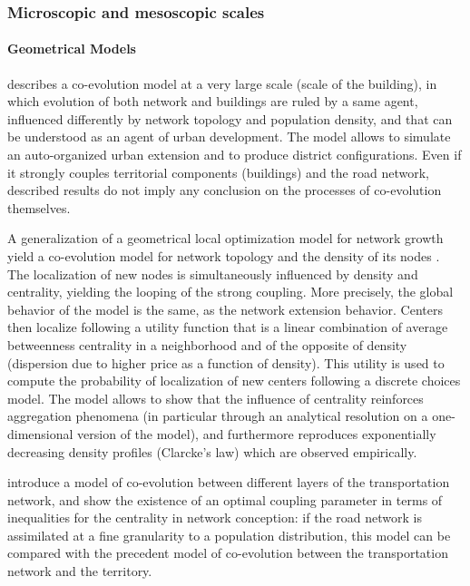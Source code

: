 \documentclass[11pt]{article}
\begin{document}
\subsubsection{Microscopic and mesoscopic scales}


\paragraph{Geometrical Models}

\cite{achibet2014model} describes a co-evolution model at a very large scale (scale of the building), in which evolution of both network and buildings are ruled by a same agent, influenced differently by network topology and population density, and that can be understood as an agent of urban development. The model allows to simulate an auto-organized urban extension and to produce district configurations. Even if it strongly couples territorial components (buildings) and the road network, described results do not imply any conclusion on the processes of co-evolution themselves.

A generalization of a geometrical local optimization model for network growth yield a co-evolution model for network topology and the density of its nodes \citep{barthelemy2009co}. The localization of new nodes is simultaneously influenced by density and centrality, yielding the looping of the strong coupling. More precisely, the global behavior of the model is the same, as the network extension behavior. Centers then localize following a utility function that is a linear combination of average betweenness centrality in a neighborhood and of the opposite of density (dispersion due to higher price as a function of density). This utility is used to compute the probability of localization of new centers following a discrete choices model. The model allows to show that the influence of centrality reinforces aggregation phenomena (in particular through an analytical resolution on a one-dimensional version of the model), and furthermore reproduces exponentially decreasing density profiles (Clarcke's law) which are observed empirically.  


\cite{ding2017heuristic} introduce a model of co-evolution between different layers of the transportation network, and show the existence of an optimal coupling parameter in terms of inequalities for the centrality in network conception: if the road network is assimilated at a fine granularity to a population distribution, this model can be compared with the precedent model of co-evolution between the transportation network and the territory.
\end{document}
